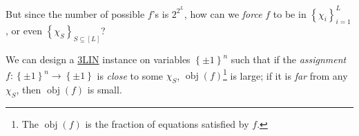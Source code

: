 \begin{problem*}
	But since the number of possible \(f\)'s is \(2^{2^L}\), how can we \emph{force} \(f\) to be in \(\left\{ \chi _i \right\}_{i = 1}^L\), or even \(\left\{ \chi _S \right\}_{S \subseteq [L]} \)?
\end{problem*}
\begin{answer}
	We can design a \hyperref[prb:max-3LIN]{3LIN} instance on variables \(\left\{ \pm 1 \right\} ^n\) such that if the \emph{assignment} \(f\colon \left\{ \pm 1 \right\} ^n \to  \left\{ \pm 1 \right\} \) is \emph{close} to some \(\chi _S\), \(\mathop{\mathrm{obj}}(f)\)\footnote{The \(\mathop{\mathrm{obj}}(f)\) is the fraction of equations satisfied by \(f\).} is large; if it is \emph{far} from any \(\chi _S\), then \(\mathop{\mathrm{obj}}(f)\) is small.
\end{answer}